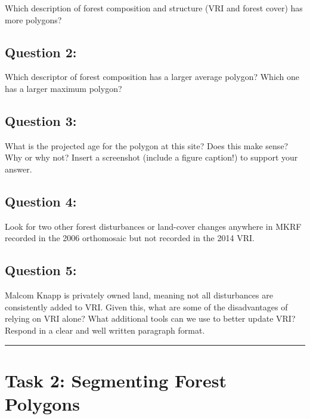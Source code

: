 \documentclass[
  letterpaper,
]{book}
\begin{document}
Which description of forest composition and structure (VRI and forest
cover) has more polygons?

\hypertarget{question-2-1}{%
\subsection{Question 2:}\label{question-2-1}}

Which descriptor of forest composition has a larger average polygon?
Which one has a larger maximum polygon?

\hypertarget{question-3-1}{%
\subsection{Question 3:}\label{question-3-1}}

What is the projected age for the polygon at this site? Does this make
sense? Why or why not? Insert a screenshot (include a figure caption!)
to support your answer.

\hypertarget{question-4-1}{%
\subsection{Question 4:}\label{question-4-1}}

Look for two other forest disturbances or land-cover changes anywhere in
MKRF recorded in the 2006 orthomosaic but not recorded in the 2014 VRI.

\hypertarget{question-5-1}{%
\subsection{Question 5:}\label{question-5-1}}

Malcom Knapp is privately owned land, meaning not all disturbances are
consistently added to VRI. Given this, what are some of the
disadvantages of relying on VRI alone? What additional tools can we use
to better update VRI? Respond in a clear and well written paragraph
format.

\begin{center}\rule{0.5\linewidth}{0.5pt}\end{center}

\hypertarget{task-2-segmenting-forest-polygons}{%
\section*{Task 2: Segmenting Forest
Polygons}\label{task-2-segmenting-forest-polygons}}
\end{document}
